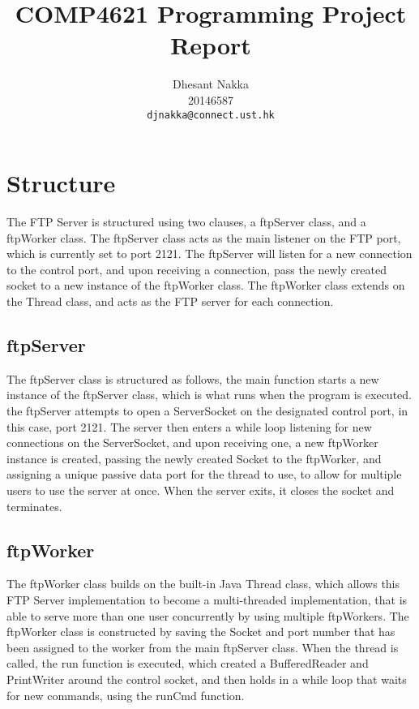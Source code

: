 \documentclass[11pt,a4paper,titlepage]{article}
\title{COMP4621 Programming Project Report}
\author{
  Dhesant Nakka \\
  20146587 \\
  \texttt{djnakka@connect.ust.hk}
}
\begin{document}
\maketitle
{}
\tableofcontents
\clearpage
{}

\section{Structure}
The FTP Server is structured using two clauses, a ftpServer class, and a ftpWorker class. The ftpServer class acts as the main listener on the FTP port, which is currently set to port 2121. The ftpServer will listen for a new connection to the control port, and upon receiving a connection, pass the newly created socket to a new instance of the ftpWorker class. The ftpWorker class extends on the Thread class, and acts as the FTP server for each connection.

\subsection{ftpServer}
The ftpServer class is structured as follows, the main function starts a new instance of the ftpServer class, which is what runs when the program is executed. the ftpServer attempts to open a ServerSocket on the designated control port, in this case, port 2121. The server then enters a while loop listening for new connections on the ServerSocket, and upon receiving one, a new ftpWorker instance is created, passing the newly created Socket to the ftpWorker, and assigning a unique passive data port for the thread to use, to allow for multiple users to use the server at once. When the server exits, it closes the socket and terminates.

\subsection{ftpWorker}
The ftpWorker class builds on the built-in Java Thread class, which allows this FTP Server implementation to become a multi-threaded implementation, that is able to serve more than one user concurrently by using multiple ftpWorkers. The ftpWorker class is constructed by saving the Socket and port number that has been assigned to the worker from the main ftpServer class. When the thread is called, the run function is executed, which created a BufferedReader and PrintWriter around the control socket, and then holds in a while loop that waits for new commands, using the runCmd function.
\end{document}
